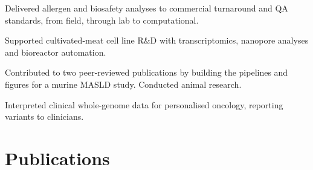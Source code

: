 \documentclass[]{deedy-resume-openfont}
\begin{document}
\begin{minipage}[t]{0.66\textwidth}
\begin{tightemize}
\item Delivered allergen and biosafety analyses to commercial turnaround and QA standards, from field, through lab to computational.
\end{tightemize}
\sectionsep

\descript{| \RoleBeneMeat}
\location{\WhenBeneMeat}
\begin{tightemize}
\item Supported cultivated-meat cell line R\&D with transcriptomics, nanopore analyses and bioreactor automation.
\end{tightemize}
\sectionsep

\descript{| \RoleLumc}
\location{\WhenLumc}
\begin{tightemize}
\item Contributed to two peer-reviewed publications by building the pipelines and figures for a murine MASLD study. Conducted animal research.
\end{tightemize}
\sectionsep

\begin{tightemize}
\item Interpreted clinical whole-genome data for personalised oncology, reporting variants to clinicians.
\end{tightemize}
\sectionsep


\section{Publications}
{\footnotesize
\PubCry{}\\
\PubAjp{}\\
\PubHep{}
}

\end{minipage}

\vspace*{\fill}
\noindent{\tiny \GdprNotice{}}
\end{document}
